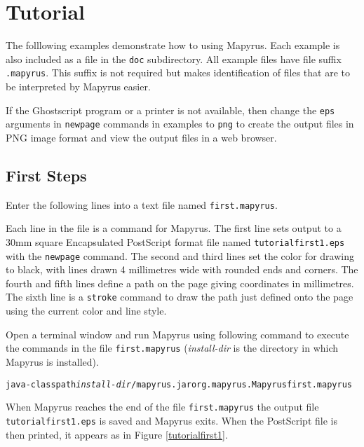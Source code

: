 
\section{Tutorial}

The folllowing examples demonstrate how to using Mapyrus.  Each example is also
included as a file in the \texttt{doc} subdirectory.  All example files
have file suffix \texttt{.mapyrus}.  This suffix is not required but makes
identification of files that are to be interpreted by Mapyrus easier.

If the Ghostscript program or a printer is not available, then change the
\texttt{eps} arguments in \texttt{newpage} commands in examples to \texttt{png}
to create the output files in PNG image format and view the output files in a
web browser.

\subsection{First Steps}

Enter the following lines into a text file named \texttt{first.mapyrus}.



Each line in the file is a command for Mapyrus.  The first line sets output to
a 30mm square Encapsulated PostScript format file named
\texttt{tutorialfirst1.eps} with the \texttt{newpage} command.  The second and
third lines set the color for drawing to black, with lines drawn 4 millimetres
wide with rounded ends and corners.  The fourth and fifth lines define a path
on the page giving coordinates in millimetres.  The sixth line is a
\texttt{stroke} command to draw the path just defined onto the page using the
current color and line style.

Open a terminal window and run Mapyrus using following command to execute the
commands in the file \texttt{first.mapyrus}
(\textit{install-dir} is the directory
in which Mapyrus is installed).

\begin{alltt}
java -classpath \textit{install-dir}/mapyrus.jar org.mapyrus.Mapyrus first.mapyrus
\end{alltt}

When Mapyrus reaches the end of the file \texttt{first.mapyrus}
the output file \texttt{tutorialfirst1.eps} is saved and Mapyrus exits.
When the PostScript file is then printed, it appears as in
Figure \ref{tutorialfirst1}.

